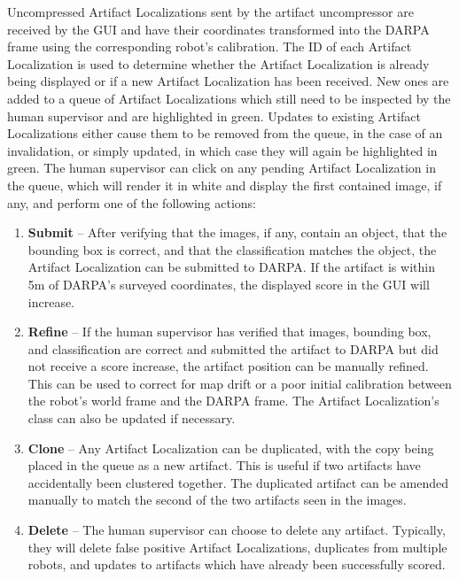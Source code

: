 Uncompressed Artifact Localizations sent by the artifact uncompressor are received by the GUI and have their coordinates transformed into the DARPA frame using the corresponding robot's calibration. The ID of each Artifact Localization is used to determine whether the Artifact Localization is already being displayed or if a new Artifact Localization has been received. New ones are added to a queue of Artifact Localizations which still need to be inspected by the human supervisor and are highlighted in green. Updates to existing Artifact Localizations either cause them to be removed from the queue, in the case of an invalidation, or simply updated, in which case they will again be highlighted in green. The human supervisor can click on any pending Artifact Localization in the queue, which will render it in white and display the first contained image, if any, and perform one of the following actions:

\begin{enumerate}
	\item \textbf{Submit} -- After verifying that the images, if any, contain an object, that the bounding box is correct, and that the classification matches the object, the Artifact Localization can be submitted to DARPA. If the artifact is within 5m of DARPA's surveyed coordinates, the displayed score in the GUI will increase.
	\item \textbf{Refine} -- If the human supervisor has verified that images, bounding box, and classification are correct and submitted the artifact to DARPA but did not receive a score increase, the artifact position can be manually refined. This can be used to correct for map drift or a poor initial calibration between the robot's world frame and the DARPA frame. The Artifact Localization's class can also be updated if necessary.
	\item \textbf{Clone} -- Any Artifact Localization can be duplicated, with the copy being placed in the queue as a new artifact. This is useful if two artifacts have accidentally been clustered together. The duplicated artifact can be amended manually to match the second of the two artifacts seen in the images.
	\item \textbf{Delete} -- The human supervisor can choose to delete any artifact. Typically, they will delete false positive Artifact Localizations, duplicates from multiple robots, and updates to artifacts which have already been successfully scored.
\end{enumerate}

